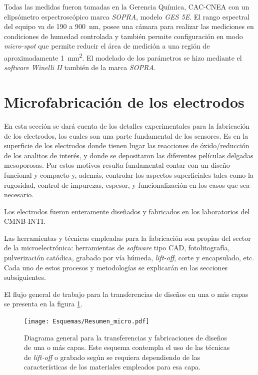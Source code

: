 		Todas las medidas fueron tomadas en la Gerencia Química, CAC-CNEA con un elipsómetro espectroscópico marca \textit{SOPRA}, modelo \textit{GES 5E}. El rango espectral del equipo va de 190 a \SI{900}{\nm}, posee una cámara para realizar las mediciones en condiciones de humedad controlada y también permite configuración en modo \textit{micro-spot} que permite reducir el área de medición a una región de aproximadamente \SI{1}{\mm^2}. El modelado de los parámetros se hizo mediante el \textit{software Winelli II} también de la marca \textit{SOPRA}.
			
\section{Microfabricación de los electrodos}
		
	 En esta sección se dará cuenta de los detalles experimentales para la fabricación de los electrodos, los cuales son una parte fundamental de los sensores. Es en la superficie de los electrodos donde tienen lugar las reacciones de óxido/reducción de los analitos de interés, y donde se depositaron las diferentes películas delgadas mesoporosas. Por estos motivos resulta fundamental contar con un diseño funcional y compacto y, además, controlar los aspectos superficiales tales como la rugosidad, control de impurezas, espesor, y funcionalización en los casos que sea necesario.

	 Los electrodos fueron enteramente diseñados y fabricados en los laboratorios del CMNB-INTI. 
		
	 Las herramientas y técnicas empleadas para la fabricación son propias del sector de la microelectrónica: herramientas de \textit{software} tipo CAD, fotolitografía, pulverización catódica, grabado por vía húmeda, \textit{lift-off}, corte y encapsulado, etc.\cite{Franssila2004,Jaeger2001} Cada uno de estos procesos y metodologías se explicarán en las secciones subsiguientes. 

	 El flujo general de trabajo para la transferencias de diseños en una o más capas se presenta en la figura \ref{esq:micro}.
			
			 \begin{figure}[t!]
			  \begin{center}
			  \texttt{[image: Esquemas/Resumen\_micro.pdf]}
			  \caption[Esquema para la transferencia de diseños]{Diagrama general para la transferencias y fabricaciones de diseños de una o más capas. Este esquema contempla el uso de las técnicas de \textit{lift-off }o grabado según se requiera dependiendo de las características de los materiales empleados para esa capa.}
			  \label{esq:micro}
			  \end{center}
			  \end{figure}


